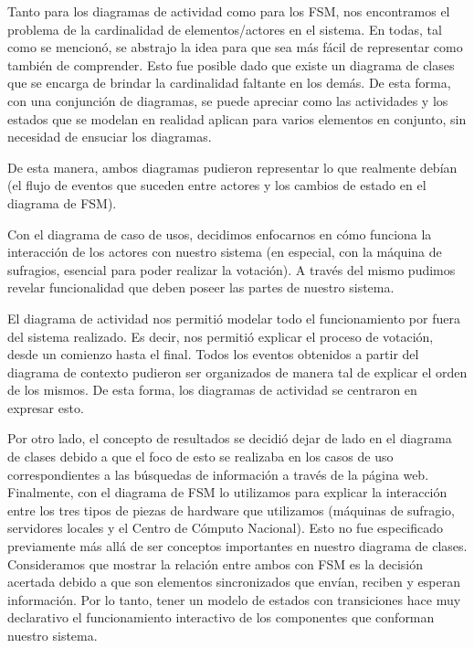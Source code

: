 \documentclass[spanish, 10pt,a4paper]{article}
\numberwithin{equation}{section} %
\begin{document}
Tanto para los diagramas de actividad como para los FSM, nos encontramos el problema de la cardinalidad de elementos/actores en el sistema. En todas, tal como se mencionó, se abstrajo la idea para que sea más fácil de representar como también de comprender. Esto fue posible dado que existe un diagrama de clases que se encarga de brindar la cardinalidad faltante en los demás. De esta forma, con una conjunción de diagramas, se puede apreciar como las actividades y los estados que se modelan en realidad aplican para varios elementos en conjunto, sin necesidad de ensuciar los diagramas. 
\par
 De esta manera, ambos diagramas pudieron representar lo que realmente debían (el flujo de eventos que suceden entre actores y los cambios de estado en el diagrama de FSM).
\par 
Con el diagrama de caso de usos, decidimos enfocarnos en cómo funciona la interacción de los actores con nuestro sistema (en especial, con la máquina de sufragios, esencial para poder realizar la votación). A través del mismo pudimos revelar funcionalidad que deben poseer las partes de nuestro sistema.
\par 
El diagrama de actividad nos permitió modelar todo el funcionamiento por fuera del sistema realizado. Es decir, nos permitió explicar el proceso de votación, desde un comienzo hasta el final. Todos los eventos obtenidos a partir del diagrama de contexto pudieron ser organizados de manera tal de explicar el orden de los mismos. De esta forma, los diagramas de actividad se centraron en expresar esto.
\par 
Por otro lado, el concepto de resultados se decidió dejar de lado en el diagrama de clases debido a que el foco de esto se realizaba en los casos de uso correspondientes a las búsquedas de información a través de la página web. 
\oar 
Finalmente, con el diagrama de FSM lo utilizamos para explicar la interacción entre los tres tipos de piezas de hardware que utilizamos (máquinas de sufragio, servidores locales y el Centro de Cómputo Nacional). Esto no fue especificado previamente más allá de ser conceptos importantes en nuestro diagrama de clases. Consideramos que mostrar la relación entre ambos con FSM es la decisión acertada debido a que son elementos sincronizados que envían, reciben y esperan información. Por lo tanto, tener un modelo de estados con transiciones hace muy declarativo el funcionamiento interactivo de los componentes que conforman nuestro sistema.
	
\end{document}
